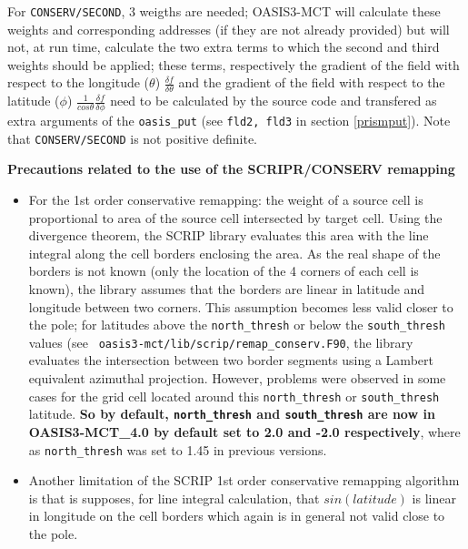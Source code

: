 \begin{itemize}
\begin{itemize}
\begin{itemize}
      For {\tt CONSERV/SECOND}, 3 weigths are needed; OASIS3-MCT will
      calculate these weights and corresponding addresses (if they are
      not already provided) but will not, at run time, calculate the
      two extra terms to which the second and third weights should be
      applied; these terms, respectively the gradient of the field
      with respect to the longitude ($\theta$) $\frac{\delta f}{\delta
        \theta}$ and the gradient of the field with respect to the
      latitude ($\phi$) $\frac{1}{cos \theta}\frac{\delta f}{\delta
        \phi}$ need to be calculated by the source code and transfered
      as extra arguments of the {\tt oasis\_put} (see {\tt fld2, fld3}
      in section \ref{prismput}).  Note that {\tt CONSERV/SECOND} is
      not positive definite.

    \end{itemize}

  \end{itemize}

  {\bf Precautions related to the use of the SCRIPR/CONSERV remapping}

  \begin{itemize}

  \item For the 1st order conservative remapping: the weight of a
    source cell is proportional to area of the source cell intersected
    by target cell.  Using the divergence theorem, the SCRIP library
    evaluates this area with the line integral along the cell borders
    enclosing the area. As the real shape of the borders is not known
    (only the location of the 4 corners of each cell is known), the
    library assumes that the borders are linear in latitude and
    longitude between two corners.  This assumption becomes less valid
    closer to the pole; for latitudes above the {\tt north\_thresh}
    or below the {\tt south\_thresh} values (see {\tt
      oasis3-mct/lib/scrip/remap\_conserv.F90}, the library evaluates
    the intersection between two border segments using a Lambert
    equivalent azimuthal projection. However, problems were observed in some
    cases for the grid cell located around this {\tt north\_thresh} or
    {\tt south\_thresh} latitude. {\bf So by default, {\tt north\_thresh} and
    {\tt south\_thresh} are now in OASIS3-MCT\_4.0 by default set to 2.0 and -2.0 respectively}, where as {\tt north\_thresh} was set to 1.45 in previous versions.

  \item Another limitation of the SCRIP 1st order conservative
    remapping algorithm is that is supposes, for line integral
    calculation, that $sin(latitude)$ is linear in longitude on the
    cell borders which again is in general not valid close to the
    pole.


\end{itemize}
\end{itemize}
